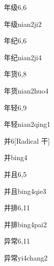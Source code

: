 \begin{entry}{年级}{6,6}
  \begin{phonetics}{年级}{nian2ji2}
  \end{phonetics}
\end{entry}

\begin{entry}{年纪}{6,6}
  \begin{phonetics}{年纪}{nian2ji4}
  \end{phonetics}
\end{entry}

\begin{entry}{年货}{6,8}
  \begin{phonetics}{年货}{nian2huo4}
  \end{phonetics}
\end{entry}

\begin{entry}{年轻}{6,9}
  \begin{phonetics}{年轻}{nian2qing1}
  \end{phonetics}
\end{entry}

\begin{entry}{并}{6}[Radical 干]
  \begin{phonetics}{并}{bing4}
  \end{phonetics}
\end{entry}

\begin{entry}{并且}{6,5}
  \begin{phonetics}{并且}{bing4qie3}
  \end{phonetics}
\end{entry}

\begin{entry}{并排}{6,11}
  \begin{phonetics}{并排}{bing4pai2}
  \end{phonetics}
\end{entry}

\begin{entry}{异常}{6,11}
  \begin{phonetics}{异常}{yi4chang2}
  \end{phonetics}
\end{entry}

